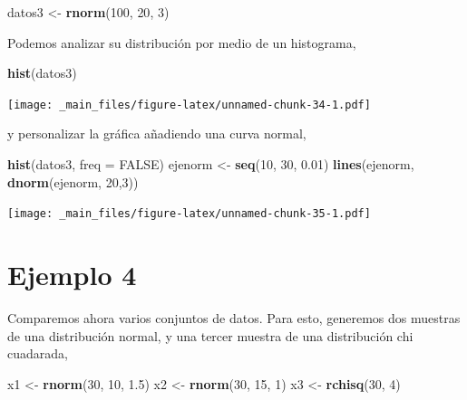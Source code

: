 \documentclass[
]{book}
\newenvironment{Shaded}{\begin{snugshade}}{\end{snugshade}}
\newcommand{\AttributeTok}[1]{\textcolor[rgb]{0.13,0.29,0.53}{#1}}
\newcommand{\ConstantTok}[1]{\textcolor[rgb]{0.56,0.35,0.01}{#1}}
\newcommand{\DecValTok}[1]{\textcolor[rgb]{0.00,0.00,0.81}{#1}}
\newcommand{\FloatTok}[1]{\textcolor[rgb]{0.00,0.00,0.81}{#1}}
\newcommand{\FunctionTok}[1]{\textcolor[rgb]{0.13,0.29,0.53}{\textbf{#1}}}
\newcommand{\NormalTok}[1]{#1}
\newcommand{\OtherTok}[1]{\textcolor[rgb]{0.56,0.35,0.01}{#1}}
\begin{document}
\begin{Shaded}
\begin{Highlighting}[]
\NormalTok{datos3 }\OtherTok{\textless{}{-}} \FunctionTok{rnorm}\NormalTok{(}\DecValTok{100}\NormalTok{, }\DecValTok{20}\NormalTok{, }\DecValTok{3}\NormalTok{)}
\end{Highlighting}
\end{Shaded}

Podemos analizar su distribución por medio de un histograma,

\begin{Shaded}
\begin{Highlighting}[]
\FunctionTok{hist}\NormalTok{(datos3)}
\end{Highlighting}
\end{Shaded}

\texttt{[image: \_main\_files/figure-latex/unnamed-chunk-34-1.pdf]}

y personalizar la gráfica añadiendo una curva normal,

\begin{Shaded}
\begin{Highlighting}[]
\FunctionTok{hist}\NormalTok{(datos3, }\AttributeTok{freq =} \ConstantTok{FALSE}\NormalTok{)}
\NormalTok{ejenorm }\OtherTok{\textless{}{-}} \FunctionTok{seq}\NormalTok{(}\DecValTok{10}\NormalTok{, }\DecValTok{30}\NormalTok{, }\FloatTok{0.01}\NormalTok{)}
\FunctionTok{lines}\NormalTok{(ejenorm, }\FunctionTok{dnorm}\NormalTok{(ejenorm, }\DecValTok{20}\NormalTok{,}\DecValTok{3}\NormalTok{))}
\end{Highlighting}
\end{Shaded}

\texttt{[image: \_main\_files/figure-latex/unnamed-chunk-35-1.pdf]}

\hypertarget{ejemplo-4}{%
\section{Ejemplo 4}\label{ejemplo-4}}

Comparemos ahora varios conjuntos de datos. Para esto, generemos dos muestras de una distribución normal, y una tercer muestra de una distribución chi cuadarada,

\begin{Shaded}
\begin{Highlighting}[]
\NormalTok{x1 }\OtherTok{\textless{}{-}} \FunctionTok{rnorm}\NormalTok{(}\DecValTok{30}\NormalTok{, }\DecValTok{10}\NormalTok{, }\FloatTok{1.5}\NormalTok{)}
\NormalTok{x2 }\OtherTok{\textless{}{-}} \FunctionTok{rnorm}\NormalTok{(}\DecValTok{30}\NormalTok{, }\DecValTok{15}\NormalTok{, }\DecValTok{1}\NormalTok{)}
\NormalTok{x3 }\OtherTok{\textless{}{-}} \FunctionTok{rchisq}\NormalTok{(}\DecValTok{30}\NormalTok{, }\DecValTok{4}\NormalTok{)}
\end{Highlighting}
\end{Shaded}
\end{document}
